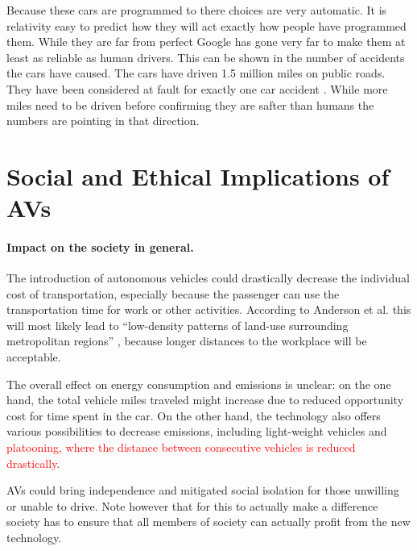 \documentclass[11pt]{article}
\newcommand{\changed}[1]{\textcolor{red}{#1}}
\begin{document}
Because these cars are programmed to there choices are very automatic. It is relativity easy to predict how they will act
exactly how people have programmed them. While they are far from perfect Google has gone very far to make them at least as
reliable as human drivers. This can be shown in the number of accidents the cars have caused. The cars have driven 1.5 million miles on public roads. They have been considered at fault for exactly one car accident \cite{chrisurmson2016}. While more miles need to be driven before confirming they are safter than humans the numbers are pointing in that direction. 

\section{Social and Ethical Implications of AVs}
\paragraph{Impact on the society in general.}
The introduction of autonomous vehicles could drastically decrease the individual cost of transportation, especially because the passenger can use the transportation time for work or other activities. According to Anderson et al. this will most likely lead to ``low-density patterns of land-use surrounding metropolitan regions'' \cite{Anderson2014rand}, because longer distances to the workplace will be acceptable.

The overall effect on energy consumption and emissions is unclear: on the one hand, the total vehicle miles traveled might increase due to reduced opportunity cost for time spent in the car. On the other hand, the technology also offers various possibilities to decrease emissions, including light-weight vehicles and \changed{platooning, where the distance between consecutive vehicles is reduced drastically}.

AVs could bring independence and mitigated social isolation for those unwilling or unable to drive. Note however that for this to actually make a difference society has to ensure that all members of society can actually profit from the new technology.
\end{document}
